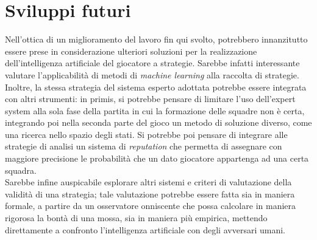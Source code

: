 \section{Sviluppi futuri}

Nell'ottica di un miglioramento del lavoro fin qui svolto, potrebbero innanzitutto essere prese in considerazione ulteriori soluzioni per la realizzazione dell'intelligenza artificiale del giocatore a strategie. Sarebbe infatti interessante valutare l'applicabilità di metodi di \emph{machine learning} alla raccolta di strategie.\\
Inoltre, la stessa strategia del sistema esperto adottata potrebbe essere integrata con altri strumenti: in primis, si potrebbe pensare di limitare l'uso dell'expert system alla sola fase della partita in cui la formazione delle squadre non è certa, integrando poi nella seconda parte del gioco un metodo di soluzione diverso, come una ricerca nello spazio degli stati. Si potrebbe poi pensare di integrare alle strategie di analisi un sistema di \emph{reputation} che permetta di assegnare con maggiore precisione le probabilità che un dato giocatore appartenga ad una certa squadra.\\
Sarebbe infine auspicabile esplorare altri sistemi e criteri di valutazione della validità di una strategia; tale valutazione potrebbe essere fatta sia in maniera formale, a partire da un osservatore onniscente che possa calcolare in maniera rigorosa la bontà di una mossa, sia in maniera più empirica, mettendo direttamente a confronto l'intelligenza artificiale con degli avversari umani.\\





